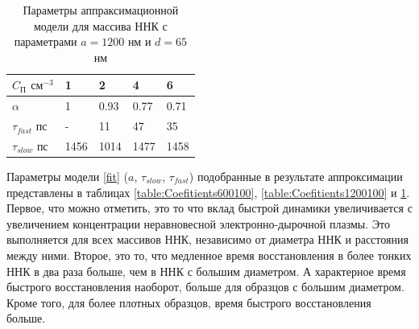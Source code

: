 \documentclass[a4paper,14pt,russian]{extreport}
\begin{document}
\begin{table}
\centering
\caption{Параметры аппраксимационной модели для массива ННК с параметрами $a = 1200$ нм и $d = 65$ нм}
\label{table:Coefitients120065}
\begin{tabular}{@{}lllll@{}}
\toprule
$C_\text{П}$ $\text{см}^{-3}$ & 1 & 2   & 4 & 6   \\ \midrule
$\alpha$                                               & 1   & 0.93 & 0.77 & 0.71 \\
$\tau_{fast}$ пс                                       & -   & 11  & 47  & 35  \\
$\tau_{slow}$ пс                                      & 1456 & 1014 & 1477 & 1458 \\ \bottomrule
\end{tabular}
\end{table}
					Параметры модели \ref{fit} ($a$, $\tau_{slow}$, $\tau_{fast}$) подобранные в результате аппроксимации представлены в таблицах \ref{table:Coefitients600100}, \ref{table:Coefitients1200100} и \ref{table:Coefitients120065}. Первое, что можно отметить, это то что вклад быстрой динамики увеличивается с увеличением концентрации неравновесной электронно-дырочной плазмы. Это выполняется для всех массивов ННК, независимо от диаметра ННК и расстояния между ними. Второе, это то, что медленное время восстановления в более тонких ННК в два раза больше, чем в ННК с большим диаметром. А характерное время быстрого восстановления наоборот, больше для образцов с большим диаметром. Кроме того, для более плотных образцов, время быстрого восстановления больше.\par
\end{document}
